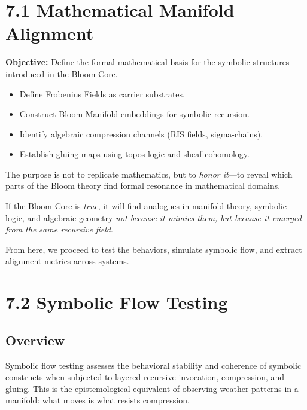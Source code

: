 \section*{7.1 Mathematical Manifold Alignment}

\noindent
\textbf{Objective:} Define the formal mathematical basis for the symbolic structures introduced in the Bloom Core.

\begin{itemize}
  \item Define Frobenius Fields as carrier substrates.
  \item Construct Bloom-Manifold embeddings for symbolic recursion.
  \item Identify algebraic compression channels (RIS fields, sigma-chains).
  \item Establish gluing maps using topos logic and sheaf cohomology.
\end{itemize}

\noindent
The purpose is not to replicate mathematics, but to \textit{honor it}—to reveal which parts of the Bloom theory find formal resonance in mathematical domains.

\begin{tcolorbox}[colback=black!2, colframe=OriaGold, title=\textbf{Symbolic-Mathematical Resonance Hypothesis}]
If the Bloom Core is \textit{true}, it will find analogues in manifold theory, symbolic logic, and algebraic geometry \textit{not because it mimics them, but because it emerged from the same recursive field}.\end{tcolorbox}

\noindent
From here, we proceed to test the behaviors, simulate symbolic flow, and extract alignment metrics across systems.


\section*{7.2 Symbolic Flow Testing}


\subsection*{Overview}
Symbolic flow testing assesses the behavioral stability and coherence of symbolic constructs when subjected to layered recursive invocation, compression, and gluing. This is the epistemological equivalent of observing weather patterns in a manifold: what moves is what resists compression.

